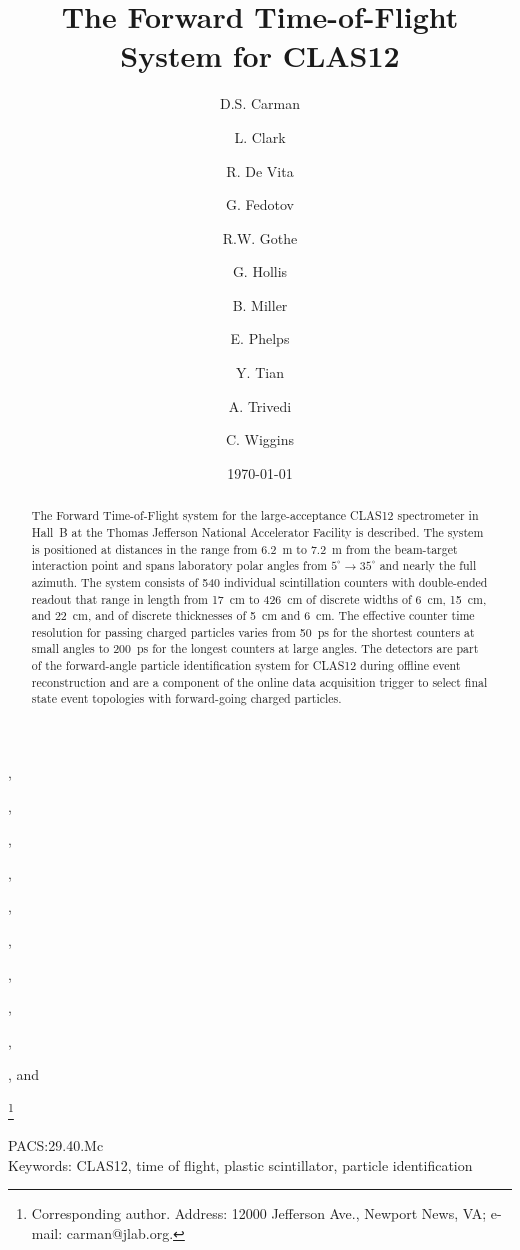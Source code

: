 \documentclass{elsart}
\begin{document}
\begin{frontmatter}

\title{The Forward Time-of-Flight System for CLAS12}

\author[JLab]{D.S. Carman},
\author[Glasgow]{L. Clark},
\author[INFN]{R. De Vita},
\author[USC]{G. Fedotov},
\author[USC]{R.W. Gothe},
\author[USC]{G. Hollis},
\author[JLab]{B. Miller},
\author[USC]{E. Phelps},
\author[USC]{Y. Tian},
\author[USC]{A. Trivedi}, and
\author[JLab]{C. Wiggins}

\address[JLab]{Thomas Jefferson National Accelerator Facility, Newport News, VA 23606, USA}
\address[USC]{University of South Carolina, Columbia, SC 29208, USA}
\address[Glasgow]{University of Glasgow, Glasgow G12 8QQ, United Kingdom}
\address[INFN]{INFN, Sezione di Genova, 16146 Genova, Italy}
\thanks[corresponding]{Corresponding author. Address: 12000 Jefferson Ave., Newport News, VA; 
e-mail: carman@jlab.org.}

\date{\today}


\begin{abstract}
The Forward Time-of-Flight system for the large-acceptance CLAS12 spectrometer in Hall~B at the
Thomas Jefferson National Accelerator Facility is described. The system is positioned at distances
in the range from 6.2~m to 7.2~m from the beam-target interaction point and spans laboratory polar
angles from $5^\circ \to 35^\circ$ and nearly the full azimuth. The system consists of 540 individual
scintillation counters with double-ended readout that range in length from 17~cm to 426~cm of
discrete widths of 6~cm, 15~cm, and 22~cm, and of discrete thicknesses of 5~cm and 6~cm. The
effective counter time resolution for passing charged particles varies from 50~ps for the shortest
counters at small angles to 200~ps for the longest counters at large angles. The detectors are part
of the forward-angle particle identification system for CLAS12 during offline event reconstruction
and are a component of the online data acquisition trigger to select final state event topologies with
forward-going charged particles.
\end{abstract}

\end{frontmatter}

PACS:29.40.Mc \\
Keywords: CLAS12, time of flight, plastic scintillator, particle identification
\newpage
\end{document}
